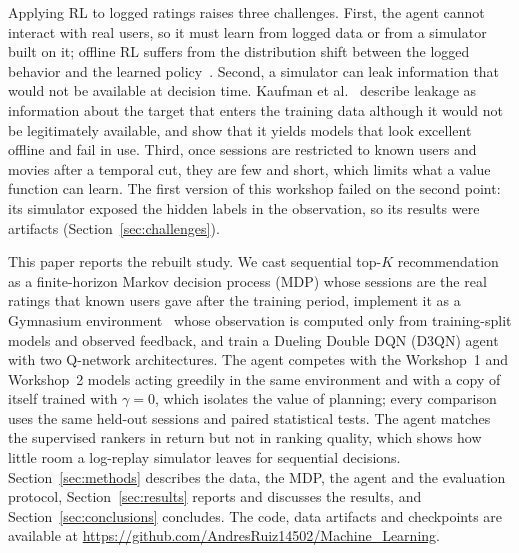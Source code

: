 Applying RL to logged ratings raises three challenges. First, the agent cannot interact with real users, so it must learn from logged data or from a simulator built on it; offline RL suffers from the distribution shift between the logged behavior and the learned policy~\cite{levine2020offline}. Second, a simulator can leak information that would not be available at decision time. Kaufman et al.~\cite{kaufman2012leakage} describe leakage as information about the target that enters the training data although it would not be legitimately available, and show that it yields models that look excellent offline and fail in use. Third, once sessions are restricted to known users and movies after a temporal cut, they are few and short, which limits what a value function can learn. The first version of this workshop failed on the second point: its simulator exposed the hidden labels in the observation, so its results were artifacts (Section~\ref{sec:challenges}).

This paper reports the rebuilt study. We cast sequential top-$K$ recommendation as a finite-horizon Markov decision process (MDP) whose sessions are the real ratings that known users gave after the training period, implement it as a Gymnasium environment~\cite{towers2024gymnasium} whose observation is computed only from training-split models and observed feedback, and train a Dueling Double DQN (D3QN) agent with two Q-network architectures. The agent competes with the Workshop~1 and Workshop~2 models acting greedily in the same environment and with a copy of itself trained with $\gamma = 0$, which isolates the value of planning; every comparison uses the same held-out sessions and paired statistical tests. The agent matches the supervised rankers in return but not in ranking quality, which shows how little room a log-replay simulator leaves for sequential decisions.
Section~\ref{sec:methods} describes the data, the MDP, the agent and the evaluation protocol, Section~\ref{sec:results} reports and discusses the results, and Section~\ref{sec:conclusions} concludes. The code, data artifacts and checkpoints are available at \url{https://github.com/AndresRuiz14502/Machine_Learning}.
